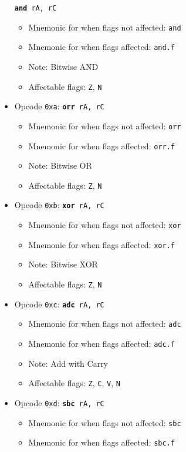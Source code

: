 \documentclass{article}
\begin{document}
\begin{itemize}
			\texttt{\textbf{and} rA, rC}
		\begin{itemize}
			\item Mnemonic for when flags not affected: \texttt{and}
			\item Mnemonic for when flags affected: \texttt{and.f}
			\item Note: Bitwise AND
			\item Affectable flags:
				\texttt{Z}, \texttt{N}
		\end{itemize}
		\item Opcode \texttt{0xa}:
			\texttt{\textbf{orr} rA, rC}
		\begin{itemize}
			\item Mnemonic for when flags not affected: \texttt{orr}
			\item Mnemonic for when flags affected: \texttt{orr.f}
			\item Note: Bitwise OR
			\item Affectable flags:
				\texttt{Z}, \texttt{N}
		\end{itemize}
		\item Opcode \texttt{0xb}:
			\texttt{\textbf{xor} rA, rC}
		\begin{itemize}
			\item Mnemonic for when flags not affected: \texttt{xor}
			\item Mnemonic for when flags affected: \texttt{xor.f}
			\item Note: Bitwise XOR
			\item Affectable flags:
				\texttt{Z}, \texttt{N}
		\end{itemize}
		\item Opcode \texttt{0xc}:
			\texttt{\textbf{adc} rA, rC}
		\begin{itemize}
			\item Mnemonic for when flags not affected: \texttt{adc}
			\item Mnemonic for when flags affected: \texttt{adc.f}
			\item Note: Add with Carry
			\item Affectable flags:
				\texttt{Z}, \texttt{C}, \texttt{V}, \texttt{N}
		\end{itemize}
		\item Opcode \texttt{0xd}:
			\texttt{\textbf{sbc} rA, rC}
		\begin{itemize}
			\item Mnemonic for when flags not affected: \texttt{sbc}
			\item Mnemonic for when flags affected: \texttt{sbc.f}

\end{itemize}
\end{itemize}
\end{document}
